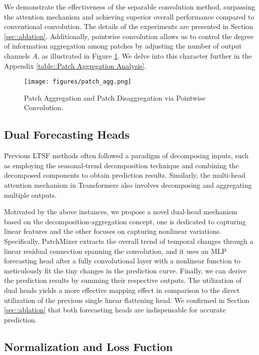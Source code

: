 \documentclass{article} \usepackage{iclr2024_conference,times}
\begin{document}
We demonstrate the effectiveness of the separable convolution method, surpassing the attention mechanism and achieving superior overall performance compared to conventional convolution. The details of the experiments are presented in Section \ref{sec::ablation}. Additionally, pointwise convolution allows us to control the degree of information aggregation among patches by adjusting the number of output channels $A$, as illustrated in Figure \ref{fig::patch_agg}. We delve into this character further in the Appendix \ref{table::Patch Aggregation Analysis}. 



\begin{figure}[h]
\begin{center}
\texttt{[image: figures/patch\_agg.png]}
\end{center}
\caption{Patch Aggregation and Patch Disaggregation via Pointwise Convolution.}
\label{fig::patch_agg}
\end{figure}

\subsection{Dual Forecasting Heads}
Previous LTSF methods often followed a paradigm of decomposing inputs, such as employing the seasonal-trend decomposition technique and combining the decomposed components to obtain prediction results. Similarly, the multi-head attention mechanism in Transformers also involves decomposing and aggregating multiple outputs. 

Motivated by the above instances, we propose a novel dual-head mechanism based on the decomposition-aggregation concept, one is dedicated to capturing linear features and the other focuses on capturing nonlinear variations. Specifically, PatchMixer extracts the overall trend of temporal changes through a linear residual connection spanning the convolution, and it uses an MLP forecasting head after a fully convolutional layer with a nonlinear function to meticulously fit the tiny changes in the prediction curve. Finally, we can derive the prediction results by summing their respective outputs. The utilization of dual heads yields a more effective mapping effect in comparison to the direct utilization of the previous single linear flattening head. We confirmed in Section \ref{sec::ablation} that both forecasting heads are indispensable for accurate prediction.

\subsection{Normalization and Loss Fuction}
\end{document}
